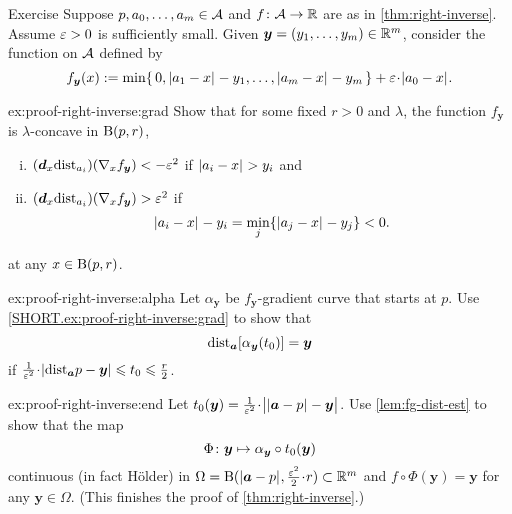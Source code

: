 \begin{thm}{Exercise}\label{ex:proof-right-inverse}
Suppose $p,a_0,\dots,a_m\in\mathcal{A}$ and $f\colon\mathcal{A}\to\mathbb{R}$ are as in \ref{thm:right-inverse}.
Assume $\varepsilon>0$ is sufficiently small.
Given $\bm{y}=(y_1,\dots,y_m)\in \mathbb{R}^m$, 
consider the function on $\mathcal{A}$ defined by
\[f_{\bm{y}}(x)\df\min\{\,0, \dist{a_1}{x}{}-y_1,\dots,\dist{a_m}{x}{}-y_m\,\}+\eps\cdot\dist{a_0}{x}{}.\]


\begin{subthm}{ex:proof-right-inverse:grad}
Show that for some fixed $r>0$ and $\lambda$, the function $f_{\bm{y}}$ is $\lambda$-concave in $\mathrm{B}{}(p,r)$,
\begin{enumerate}[(i)]
\item\label{111} $(\bm{d}_x\mathrm{dist}_{a_i})(\nabla_x f_{\bm{y}})<-\varepsilon^2$ if $|{a_i}-{x}|_{}^{{}}>y_i$ and
\item\label{222} $(\bm{d}_x\mathrm{dist}_{a_i})(\nabla_x f_{\bm{y}})>\varepsilon^2$ if 
\[|{a_i}-{x}|_{}^{{}}-y_i=\min_j\{|{a_j}-{x}|_{}^{{}}-y_j\}<0.\]
\end{enumerate}
at any $x\in \mathrm{B}{}(p,r)$.

\end{subthm}

\begin{subthm}{ex:proof-right-inverse:alpha}
Let $\alpha_{\bm{y}}$ be $f_{\bm{y}}$-gradient curve that starts at $p$.
Use \ref{SHORT.ex:proof-right-inverse:grad} to show that 
\[
\mathrm{dist}_{\bm{a}}{[\alpha_{\bm{y}}(t_0)]}
= 
\bm{y}\]
if 
$\tfrac1{\eps^2}\cdot|\distfun_{\bm{a}}{p}-\bm{y}|
\le
t_0
\le
\tfrac{r}{2}$.

\end{subthm}

\begin{subthm}{ex:proof-right-inverse:end}
Let $t_0(\bm{y})=\tfrac{1}{\eps^2}\cdot\bigl|\dist{\bm{a}}{p}{}-\bm{y}\bigr|$.
Use \ref{lem:fg-dist-est} to show that the map
\[\Phi\colon{\bm{y}}\mapsto \alpha_{\bm{y}}\circ t_0(\bm{y})\]
continuous (in fact H\"older) in $\Omega=\oBall(\dist{\bm{a}}{p}{},\tfrac{\eps^2}{2}\cdot r )\subset\RR^m$
and $f\circ \Phi(\bm{y})=\bm{y}$ for any $\bm{y}\in \Omega$.
(This finishes the proof of \ref{thm:right-inverse}.)
\end{subthm}

\end{thm}


